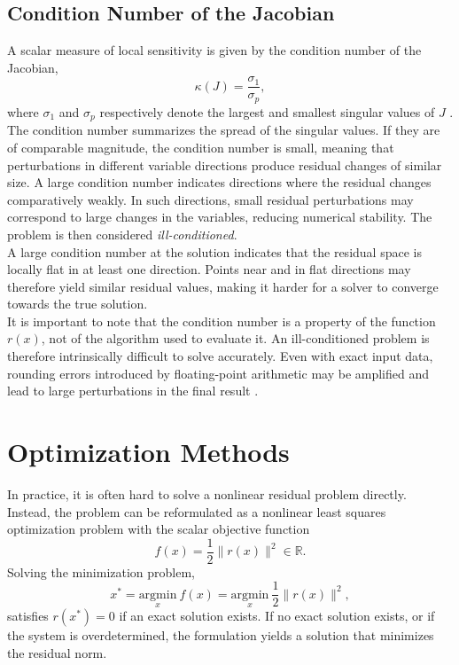 \subsection{Condition Number of the Jacobian}
A scalar measure of local sensitivity is given by the condition number of the Jacobian,
\begin{equation}
    \label{eq:cond_num_def}
\kappa(J) = \frac{\sigma_1}{\sigma_p},
\end{equation}
where $\sigma_1$ and $\sigma_p$ respectively denote the largest and smallest singular values of $J$ \cite[pp.~131-134]{bjork2008}.\\

The condition number summarizes the spread of the singular values. If they are of comparable magnitude, the condition number is small, meaning that perturbations in different variable directions produce residual changes of similar size. A large condition number indicates directions where the residual changes comparatively weakly. In such directions, small residual perturbations may correspond to large changes in the variables, reducing numerical stability. The problem is then considered \emph{ill-conditioned}.\\

A large condition number at the solution indicates that the residual space is locally flat in at least one direction. Points near and in flat directions may therefore yield similar residual values, making it harder for a solver to converge towards the true solution.\\

It is important to note that the condition number is a property of the function $r(x)$, not of the algorithm used to evaluate it. An ill-conditioned problem is therefore intrinsically difficult to solve accurately. Even with exact input data, rounding errors introduced by floating-point arithmetic may be amplified and lead to large perturbations in the final result \cite[p.~133]{bjork2008}.

\newpage
\section{Optimization Methods}
\label{sec:theory_optmet}

In practice, it is often hard to solve a nonlinear residual problem directly. Instead, the problem can be reformulated as a nonlinear least squares optimization problem with the scalar objective function
\begin{equation*}
f(x) = \frac{1}{2} \| r(x) \|^2 \in \mathbb{R}.
\end{equation*}
Solving the minimization problem,
\begin{equation}
\label{eq:min_problem}
    x^\ast = \underset{x}{\text{argmin}} \ f(x) = \underset{x}{\text{argmin}} \ \frac{1}{2} \| r(x) \|^2,
\end{equation}
satisfies $r(x^*) = 0$ if an exact solution exists. If no exact solution exists, or if the system is overdetermined, the formulation yields a solution that minimizes the residual norm.\\

